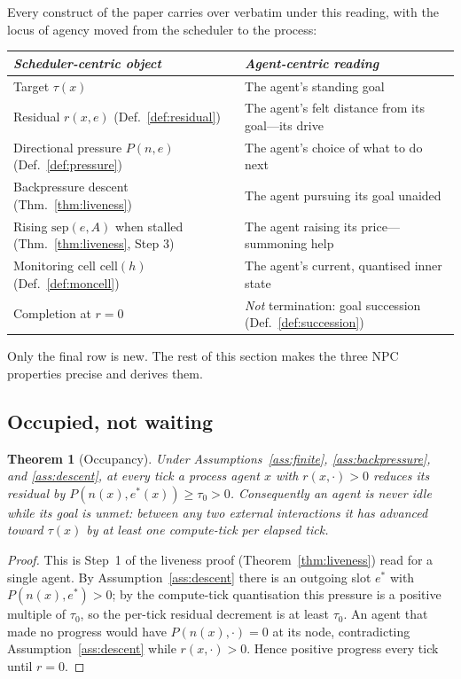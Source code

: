 \documentclass[11pt,twocolumn,a4paper]{article}
\theoremstyle{plain}
\newtheorem{theorem}{Theorem}[section]
\theoremstyle{definition}
\theoremstyle{remark}
\newcommand{\tick}{\tau_0}
\newcommand{\sep}{\mathrm{sep}}
\newcommand{\cell}{\mathrm{cell}}
\newcommand{\pres}{P}
\begin{document}
Every construct of the paper carries over verbatim under this reading, with the
locus of agency moved from the scheduler to the process:

\begin{center}
\small
\begin{tabular}{@{}p{}p{}@{}}
\toprule
\emph{Scheduler-centric object} & \emph{Agent-centric reading} \\
\midrule
Target $\tau(x)$ & The agent's standing goal \\
Residual $r(x,e)$ (Def.~\ref{def:residual}) & The agent's felt distance from its goal---its drive \\
Directional pressure $\pres(n,e)$ (Def.~\ref{def:pressure}) & The agent's choice of what to do next \\
Backpressure descent (Thm.~\ref{thm:liveness}) & The agent pursuing its goal unaided \\
Rising $\sep(e,A)$ when stalled (Thm.~\ref{thm:liveness}, Step 3) & The agent raising its price---summoning help \\
Monitoring cell $\cell(h)$ (Def.~\ref{def:moncell}) & The agent's current, quantised inner state \\
Completion at $r = 0$ & \emph{Not} termination: goal succession (Def.~\ref{def:succession}) \\
\bottomrule
\end{tabular}
\end{center}

Only the final row is new. The rest of this section makes the three NPC properties
precise and derives them.

\subsection{Occupied, not waiting}

\begin{theorem}[Occupancy]
\label{thm:occupied}
Under Assumptions~\ref{ass:finite}, \ref{ass:backpressure}, and \ref{ass:descent},
at every tick a process agent $x$ with $r(x,\cdot) > 0$ reduces its residual by
$\pres(n(x), e^*(x)) \geq \tick > 0$. Consequently an agent is \emph{never idle
while its goal is unmet}: between any two external interactions it has advanced
toward $\tau(x)$ by at least one compute-tick per elapsed tick.
\end{theorem}

\begin{proof}
This is Step~1 of the liveness proof (Theorem~\ref{thm:liveness}) read for a single
agent. By Assumption~\ref{ass:descent} there is an outgoing slot $e^*$ with
$\pres(n(x), e^*) > 0$; by the compute-tick quantisation this pressure is a
positive multiple of $\tick$, so the per-tick residual decrement is at least
$\tick$. An agent that made no progress would have $\pres(n(x), \cdot) = 0$ at its
node, contradicting Assumption~\ref{ass:descent} while $r(x,\cdot) > 0$. Hence
positive progress every tick until $r = 0$.
\end{proof}
\end{document}

